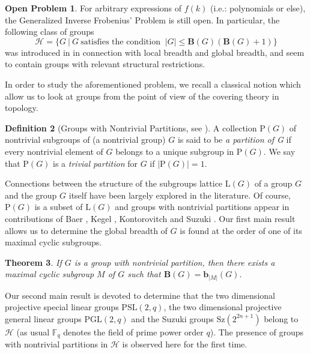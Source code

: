 \documentclass{amsart}
\newtheorem{theorem}{Theorem}[section]
\theoremstyle{definition}
\newtheorem{definition}[theorem]{Definition}
\newtheorem{problem}[theorem]{Open Problem}
\numberwithin{equation}{section}
\begin{document}
\begin{problem} For arbitrary expressions of $f(k)$ (i.e.: polynomials or else), the Generalized Inverse Frobenius' Problem is still open. In particular, the following class of groups
\begin{equation}\label{classh}\mathcal{H}=\{G \ | \ G \ \mbox{satisfies the condition } \ |G| \le \mathbf{B}(G)(\mathbf{B}(G) + 1)\}
\end{equation}
was introduced in \cite[Section 8]{hr3} in connection with local breadth and global breadth, and seem to contain groups with relevant structural restrictions.\end{problem}

In order to study the aforementioned problem, we recall a classical notion which allow us to look at groups from the point of view of the covering theory in topology. 


\begin{definition}[Groups with Nontrivial Partitions, see \cite{baer1}]
A collection $\mathrm{P}(G)$ of nontrivial subgroups of (a nontrivial group) $G$  is said to be \textit{a partition of G} if every nontrivial element of $G$ belongs to a unique subgroup in $\mathrm{P}(G)$. We say that  $\mathrm{P}(G)$ is a \textit{trivial partition} for $G$ if $|\mathrm{P}(G)|=1$. \end{definition}

Connections between the structure of the subgroups lattice $\mathrm{L}(G)$  of a group $G$ and the group $G$ itself  have  been largely explored in the literature. Of course, $\mathrm{P}(G)$ is a subset of $\mathrm{L}(G)$  and  groups with nontrivial partitions appear in contributions of  Baer \cite{baer1, baer2}, Kegel \cite{kegel1, kegel2, kegel3}, Kontorovitch \cite{kont} and Suzuki \cite{suzuki}.  Our first main result allows us to determine the global breadth of $G$ is found at the order of one of its maximal cyclic subgroups.
 

\begin{theorem}\label{l0} If $G$ is a group with nontrivial partition, then there exists a maximal cyclic subgroup $M$ of $G$ such that $\mathbf{B}(G)=\mathbf{b}_{|M|}(G).$
\end{theorem} 

Our second main result  is devoted to determine that the two dimensional projective special linear groups $\mathrm{PSL}(2,q)$, the two dimensional projective general linear groups $\mathrm{PGL}(2,q)$ and the Suzuki groups $\mathrm{Sz}(2^{2n+1})$ belong to $\mathcal{H}$ (as usual $\mathbb{F}_q$ denotes the field of prime power order $q$). The presence of groups with nontrivial partitions in $\mathcal{H}$ is observed here for the first time. 
\end{document}

